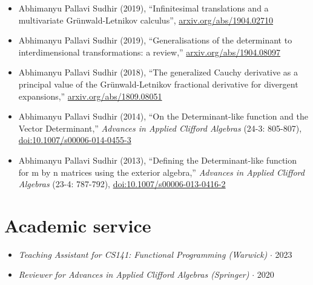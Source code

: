 \documentclass{article}
\begin{document}

\begin{itemize}

    \item
          Abhimanyu Pallavi Sudhir (2019),
          ``Infinitesimal translations and a multivariate Gr\"unwald-Letnikov calculus'', \href{https://arxiv.org/abs/1904.02710}{arxiv.org/abs/1904.02710}

    \item
          Abhimanyu Pallavi Sudhir (2019),
          ``Generalisations of the determinant to interdimensional transformations: a review,'' \href{https://arxiv.org/abs/1904.08097}{arxiv.org/abs/1904.08097}

    \item
          Abhimanyu Pallavi Sudhir (2018),
          ``The generalized Cauchy derivative as a principal value of the Gr\"unwald-Letnikov fractional derivative for divergent expansions,'' \href{https://arxiv.org/abs/1809.08051}{arxiv.org/abs/1809.08051}

    \item
          Abhimanyu Pallavi Sudhir (2014),
          ``On the Determinant-like function and the Vector Determinant,''
          \emph{Advances in Applied Clifford Algebras} (24-3: 805-807), \href{https://link.springer.com/article/10.1007/s00006-014-0455-3}{doi:10.1007/s00006-014-0455-3}

    \item
          Abhimanyu Pallavi Sudhir (2013),
          ``Defining the Determinant-like function for m by n matrices using the exterior algebra,''
          \emph{Advances in Applied Clifford Algebras} (23-4: 787-792),
          \href{https://link.springer.com/article/10.1007/s00006-013-0416-2}{doi:10.1007/s00006-013-0416-2}

\end{itemize}

\section*{Academic service}

\begin{itemize}

    \item \emph{Teaching Assistant for CS141: Functional Programming (Warwick)} $\cdot$ 2023

    \item \emph{Reviewer for Advances in Applied Clifford Algebras (Springer)} $\cdot$ 2020

\end{itemize}
\end{document}
